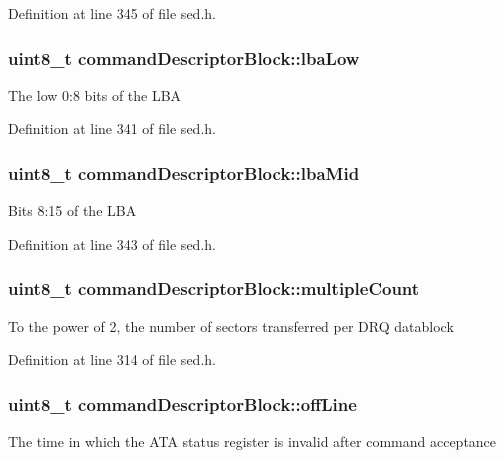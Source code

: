 Definition at line 345 of file sed.\+h.

\hypertarget{structcommandDescriptorBlock_a43d0f9e75b22b331a36355ca2572be62}{
\subsubsection[{lba\+Low}]{\setlength{\rightskip}{0pt plus 5cm}uint8\+\_\+t command\+Descriptor\+Block\+::lba\+Low}}\label{structcommandDescriptorBlock_a43d0f9e75b22b331a36355ca2572be62}
The low 0\+:8 bits of the L\+B\+A 

Definition at line 341 of file sed.\+h.

\hypertarget{structcommandDescriptorBlock_a9bb5feca3b443efb128ceeada152a7d4}{
\subsubsection[{lba\+Mid}]{\setlength{\rightskip}{0pt plus 5cm}uint8\+\_\+t command\+Descriptor\+Block\+::lba\+Mid}}\label{structcommandDescriptorBlock_a9bb5feca3b443efb128ceeada152a7d4}
Bits 8\+:15 of the L\+B\+A 

Definition at line 343 of file sed.\+h.

\hypertarget{structcommandDescriptorBlock_a32ebf87ad241e36d46bf924327b1737e}{
\subsubsection[{multiple\+Count}]{\setlength{\rightskip}{0pt plus 5cm}uint8\+\_\+t command\+Descriptor\+Block\+::multiple\+Count}}\label{structcommandDescriptorBlock_a32ebf87ad241e36d46bf924327b1737e}
To the power of 2, the number of sectors transferred per D\+R\+Q datablock 

Definition at line 314 of file sed.\+h.

\hypertarget{structcommandDescriptorBlock_abb39bf783f6d828c385f16b0909bdaaf}{
\subsubsection[{off\+Line}]{\setlength{\rightskip}{0pt plus 5cm}uint8\+\_\+t command\+Descriptor\+Block\+::off\+Line}}\label{structcommandDescriptorBlock_abb39bf783f6d828c385f16b0909bdaaf}
The time in which the A\+T\+A status register is invalid after command acceptance 


